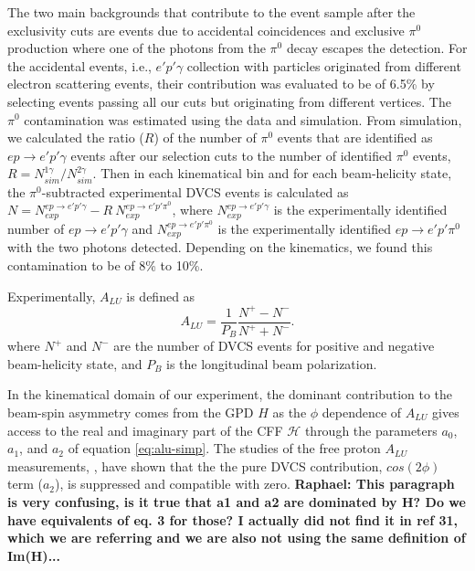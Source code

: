 \documentclass[twocolumn,nofootinbib,showpacs,prl,superscriptaddress,secnumarabic,amssymb,nobibnotes,aps,floatfix]{revtex4}
\begin{document}
The two main backgrounds that contribute to the event sample after the exclusivity cuts are  
events due to accidental coincidences and exclusive $\pi^0$ production where one of the photons 
from the $\pi^0$ decay escapes the detection. For the accidental events, i.e., $e'p'\gamma$ collection 
with particles originated from different electron scattering events, their contribution 
was evaluated to be of 6.5\% by selecting events passing all our cuts but originating from 
different vertices. The $\pi^0$ contamination was estimated using the data and 
simulation. From simulation, we calculated the ratio ($R$) of the number of $\pi^0$ 
events that are identified as $ep\rightarrow e'p'\gamma$ events after our selection 
cuts to the number of identified $\pi^0$ events, 
$R = N^{1\gamma}_{sim}/N^{2\gamma}_{sim}$. Then in each kinematical bin and for 
each beam-helicity state, the $\pi^0$-subtracted experimental DVCS events is 
calculated as $N = N^{ep\rightarrow e'p'\gamma}_{exp}- R~N^{ep\rightarrow 
e'p'\pi^0}_{exp}$, where $N^{ep\rightarrow e'p'\gamma}_{exp}$ is the 
experimentally identified number of $ep\rightarrow e'p'\gamma$ and 
$N^{ep\rightarrow e'p'\pi^0}_{exp}$ is the experimentally identified 
$ep\rightarrow e'p'\pi^0$ with the two photons detected. Depending on the 
kinematics, we found this contamination to be of 8\% to 10\%. 


Experimentally, $A_{LU}$ is defined as
\begin{equation}
A_{LU} = \frac{1}{P_{B}} \frac{N^{+} - N^{-}}{N^{+} + N^{-} }.
\end{equation}
where $N^{+}$ and $N^{-}$ are the number of DVCS events for positive and negative 
beam-helicity state, and $P_{B}$ is the longitudinal beam polarization.  

In the kinematical domain of our experiment, the dominant contribution to the 
beam-spin asymmetry comes from the GPD $H$ \cite{Guidal:2013rya} as the $\phi$ 
dependence of $A_{LU}$ gives access to the real and imaginary part of the CFF 
$\mathcal{H}$ through the parameters $a_0$, $a_1$, and $a_2$ of equation \ref{eq:alu-simp}. The studies of  
the free proton $A_{LU}$ measurements, \cite{Girod:2007aa}, have 
shown that the the pure DVCS contribution, $cos(2\phi)$ term ($a_2$), is suppressed and compatible with zero.  
{\bf Raphael: This paragraph is very confusing, is it true that a1 and a2 are 
dominated by H? Do we have equivalents of eq. 3 for those? I actually did not find
it in ref 31, which we are referring and we are also not using the same definition
of Im(H)...}
\end{document}
